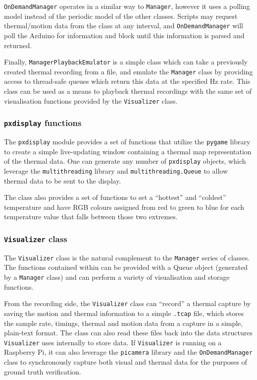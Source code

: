 \documentclass[../thesis/thesis.tex]{subfiles}
\begin{document}
\texttt{OnDemandManager} operates in a similar way to \texttt{Manager}, however it uses a polling model instead of the periodic model of the other classes. Scripts may request thermal/motion data from the class at any interval, and \texttt{OnDemandManager} will poll the Arduino for information and block until this information is parsed and returned.

Finally, \texttt{ManagerPlaybackEmulator} is a simple class which can take a previously created thermal recording from a file, and emulate the \texttt{Manager} class by providing access to thread-safe queues which return this data at the specified Hz rate. This class can be used as a means to playback thermal recordings with the same set of visualisation functions provided by the \texttt{Visualizer} class.

\subsubsection*{\texttt{pxdisplay} functions}

The \texttt{pxdisplay} module provides a set of functions that utilize the \texttt{pygame} library to create a simple live-updating window containing a thermal map representation of the thermal data. One can generate any number of \texttt{pxdisplay} objects, which leverage the \texttt{multithreading} library and \texttt{multithreading.Queue} to allow thermal data to be sent to the display.

The class also provides a set of functions to set a ``hottest'' and ``coldest'' temperature and have RGB colours assigned from red to green to blue for each temperature value that falls between those two extremes.

\subsubsection*{\texttt{Visualizer} class}
The \texttt{Visualizer} class is the natural complement to the \texttt{Manager} series of classes. The functions contained within can be provided with a Queue object (generated by a \texttt{Manager} class) and can perform a variety of visualisation and storage functions.

From the recording side, the \texttt{Visualizer} class can ``record'' a thermal capture by saving the motion and thermal information to a simple \texttt{.tcap} file, which stores the sample rate, timings, thermal and motion data from a capture in a simple, plain-text format. The class can also read these files back into the data structures \texttt{Visualizer} uses internally to store data. If \texttt{Visualizer} is running on a Raspberry Pi, it can also leverage the \texttt{picamera} library and the \texttt{OnDemandManager} class to synchronously capture both visual and thermal data for the purposes of ground truth verification.
\end{document}
